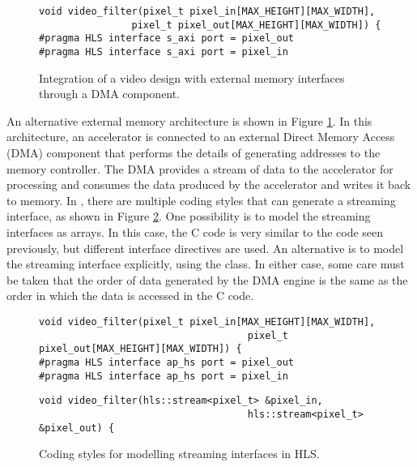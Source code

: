 \begin{figure}
\centering
\framebox{}
\begin{lstlisting}
void video_filter(pixel_t pixel_in[MAX_HEIGHT][MAX_WIDTH],
				pixel_t pixel_out[MAX_HEIGHT][MAX_WIDTH]) {
#pragma HLS interface s_axi port = pixel_out
#pragma HLS interface s_axi port = pixel_in
\end{lstlisting}
\caption{Integration of a video design with external memory interfaces through a DMA component.}\label{fig:video:DDR_DMA_interface}
\end{figure}

An alternative external memory architecture is shown in Figure \ref{fig:video:DDR_DMA_interface}.  In this architecture, an accelerator is connected to an external Direct Memory Access (DMA) component that performs the details of generating addresses to the memory controller.  The DMA provides a stream of data to the accelerator for processing and consumes the data produced by the accelerator and writes it back to memory.  In \VHLS, there are multiple coding styles that can generate a streaming interface, as shown in Figure \ref{fig:video:stream_interfaces}.  One possibility is to model the streaming interfaces as arrays.  In this case, the C code is very similar to the code seen previously, but different interface directives are used.  An alternative is to model the streaming interface explicitly, using the  class.  In either case, some care must be taken that the order of data generated by the DMA engine is the same as the order in which the data is accessed in the C code.

\begin{figure}
\centering
\begin{lstlisting}
void video_filter(pixel_t pixel_in[MAX_HEIGHT][MAX_WIDTH],
									pixel_t pixel_out[MAX_HEIGHT][MAX_WIDTH]) {
#pragma HLS interface ap_hs port = pixel_out
#pragma HLS interface ap_hs port = pixel_in
\end{lstlisting}
\begin{lstlisting}
void video_filter(hls::stream<pixel_t> &pixel_in,
									hls::stream<pixel_t> &pixel_out) {
\end{lstlisting}

\caption{Coding styles for modelling streaming interfaces in HLS.}\label{fig:video:stream_interfaces}
\end{figure}

